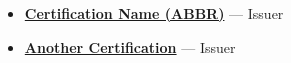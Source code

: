 \begin{itemize}
  \item \href{https://example.com/certificate-1}{\textbf{Certification Name (ABBR)}} --- Issuer
  \item \href{https://example.com/certificate-2}{\textbf{Another Certification}} --- Issuer
\end{itemize}
